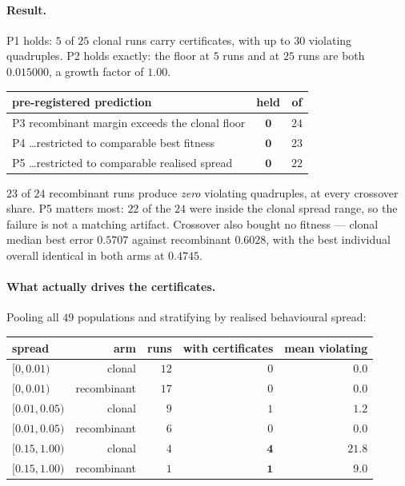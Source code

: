 \documentclass[11pt,a4paper]{article}
\theoremstyle{definition}
\theoremstyle{remark}
\begin{document}
\paragraph{Result.} P1 holds: $5$ of $25$ clonal runs carry certificates, with up
to $30$ violating quadruples. P2 holds exactly: the floor at $5$ runs and at $25$
runs are both $0.015000$, a growth factor of $1.00$.

\begin{center}\footnotesize
\begin{tabular}{@{}lcc@{}}
\toprule
pre-registered prediction & held & of \\
\midrule
P3 recombinant margin exceeds the clonal floor & $\mathbf{0}$ & $24$ \\
P4 \ldots restricted to comparable best fitness & $\mathbf{0}$ & $23$ \\
P5 \ldots restricted to comparable realised spread & $\mathbf{0}$ & $22$ \\
\bottomrule
\end{tabular}
\end{center}

$23$ of $24$ recombinant runs produce \emph{zero} violating quadruples, at every
crossover share. P5 matters most: $22$ of the $24$ were inside the clonal spread
range, so the failure is not a matching artifact. Crossover also bought no
fitness --- clonal median best error $0.5707$ against recombinant $0.6028$, with
the best individual overall identical in both arms at $0.4745$.

\paragraph{What actually drives the certificates.} Pooling all $49$ populations
and stratifying by realised behavioural spread:

\begin{center}\footnotesize
\begin{tabular}{@{}lrrrr@{}}
\toprule
spread & arm & runs & with certificates & mean violating \\
\midrule
$[0, 0.01)$ & clonal & $12$ & $0$ & $0.0$ \\
$[0, 0.01)$ & recombinant & $17$ & $0$ & $0.0$ \\
$[0.01, 0.05)$ & clonal & $9$ & $1$ & $1.2$ \\
$[0.01, 0.05)$ & recombinant & $6$ & $0$ & $0.0$ \\
$[0.15, 1.00)$ & clonal & $4$ & $\mathbf{4}$ & $21.8$ \\
$[0.15, 1.00)$ & recombinant & $1$ & $\mathbf{1}$ & $9.0$ \\
\bottomrule
\end{tabular}
\end{center}
\end{document}
